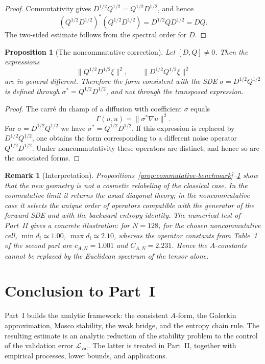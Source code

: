 \documentclass{article}
\newtheorem{proposition}[theorem]{Proposition}
\newtheorem{remark}[theorem]{Remark}
\newcommand{\Eval}{\mathcal L_{\mathrm{val}}}
\begin{document}
\begin{proof}
Commutativity gives \(D^{1/2}Q^{1/2}=Q^{1/2}D^{1/2}\), and hence
\[
        (Q^{1/2}D^{1/2})^*(Q^{1/2}D^{1/2})=D^{1/2}QD^{1/2}=DQ .
\]
The two-sided estimate follows from the spectral order for \(D\).
\end{proof}

\begin{proposition}[The noncommutative correction]
\label{prop:noncomm-correction}
Let \([D,Q]\ne0\). Then the expressions
\[
        \|Q^{1/2}D^{1/2}\xi\|^2,
        \qquad
        \|D^{1/2}Q^{1/2}\xi\|^2
\]
are in general different. Therefore the form consistent with the SDE
\(\sigma=D^{1/2}Q^{1/2}\) is defined through \(\sigma^*=Q^{1/2}D^{1/2}\), and
not through the transposed expression.
\end{proposition}

\begin{proof}
The carr\'e du champ of a diffusion with coefficient \(\sigma\) equals
\[
        \Gamma(u,u)=\|\sigma^*\nabla u\|^2.
\]
For \(\sigma=D^{1/2}Q^{1/2}\) we have \(\sigma^*=Q^{1/2}D^{1/2}\). If this
expression is replaced by \(D^{1/2}Q^{1/2}\), one obtains the form
corresponding to a different noise operator \(Q^{1/2}D^{1/2}\). Under
noncommutativity these operators are distinct, and hence so are the associated
forms.
\end{proof}

\begin{remark}[Interpretation]
Propositions~\ref{prop:commutative-benchmark}--\ref{prop:noncomm-correction}
show that the new geometry is not a cosmetic relabeling of the classical case.
In the commutative limit it returns the usual diagonal theory; in the
noncommutative case it selects the unique order of operators compatible with
the generator of the forward SDE and with the backward entropy identity. The
numerical test of Part~II gives a concrete illustration: for
\(N=128\), for the chosen noncommutative cell, \(\min d_i\simeq1.00\),
\(\max d_i\simeq2.10\), whereas the operator constants from Table~1 of the
second part are \(c_{A,N}=1.001\) and \(C_{A,N}=2.231\). Hence the
\(A\)-constants cannot be replaced by the Euclidean spectrum of the tensor
alone.
\end{remark}

\section{Conclusion to Part~I}

Part~I builds the analytic framework: the consistent \(A\)-form, the Galerkin
approximation, Mosco stability, the weak bridge, and the entropy chain rule.
The resulting estimate is an analytic reduction of the stability problem to
the control of the validation error \(\Eval\). The latter is treated in Part~II, together with empirical processes, lower bounds, and applications.



\end{document}
